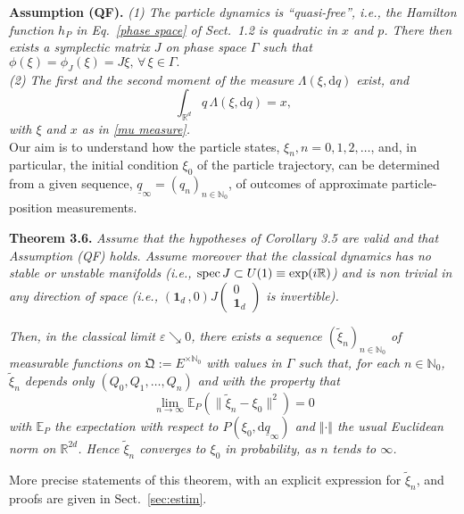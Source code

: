 \documentclass[11pt]{article}
\begin{document}
\vspace{0.2cm}\noindent
{\bf{Assumption (QF).}} \textit{(1) The particle dynamics is ``quasi-free'', i.e., the Hamilton function $h_P$ in 
Eq.~\eqref{phase space} of Sect.~1.2 is quadratic in $x$ and $p$. There then exists a symplectic matrix $J$ 
on phase space $\Gamma$ such that $\phi(\xi)=\phi_{J}(\xi)= J\xi,\, \forall\, \xi \in \Gamma.$} \\
\textit{(2) The first and the second moment of the measure} $\Lambda(\xi, \text{d}q)$ \textit{exist, and}
\begin{equation}\label{momen}
\int_{\mathbb{R}^{d}} q\, \Lambda(\xi, \text{d}q)= x, 
\end{equation}
\textit{with $\xi$ and $x$ as in \eqref{mu measure}.}\\

Our aim is to understand how
the particle states, $\xi_n, n=0,1,2, \dots$, and, in particular, the initial condition $\xi_0$ of the particle trajectory, 
can be determined from a given sequence, $\underline{q}_{\infty} =(q_n)_{n\in \mathbb{N}_0}$, of outcomes of approximate
particle-position measurements.

\vspace{0.2cm}\noindent
{\bf{Theorem 3.6.}} \textit{Assume that the hypotheses of Corollary 3.5 are valid and that Assumption (QF) holds. Assume moreover that the classical dynamics has no stable or unstable  manifolds (i.e., $\operatornamewithlimits{spec}J\subset U(1)\equiv \text{exp}(i \mathbb{R})$) and is non trivial in any direction of space (i.e., $(\mathbf{1}_d\,, 0)J\left(\substack{0\\\mathbf{1}_d}\right)$ is invertible).}

\textit{Then, in the classical limit $\varepsilon \searrow 0$, there exists a sequence $(\tilde \xi_n)_{n\in\mathbb N_0}$ 
of measurable functions on $\mathfrak{Q}:= E^{\times \mathbb{N}_0}$ with values in $\Gamma$ such that, for each $n\in \mathbb N_0$, $\tilde\xi_n$ depends only $(Q_0,Q_1,\dotsc,Q_n)$ and with the property that}
$$\lim_{n\to\infty}\mathbb E_{P}(\|\tilde\xi_n-\xi_0\|^2)=0$$
\textit{with $\mathbb E_P$ the expectation with respect to $P(\xi_0,\mathrm{d}\underline{q}_\infty)$ and 
$\Vert \cdot \Vert$ the usual Euclidean norm on $\mathbb{R}^{2d}$. Hence $\tilde \xi_n$ converges to 
$\xi_0$ in probability, as $n$ tends to $\infty$.}

\vspace{0.15cm}More precise statements of this theorem, with an explicit expression for $\tilde \xi_n$, and proofs are 
given in Sect.~\ref{sec:estim}.
\end{document}
